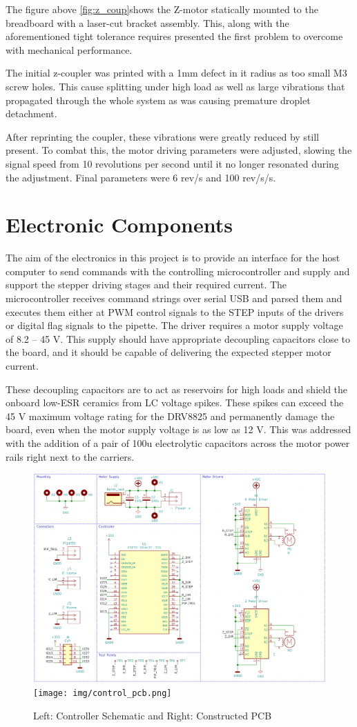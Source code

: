 The figure above \ref{fig:z_coup}shows the Z-motor statically mounted to the breadboard with a laser-cut bracket assembly. This, along with the aforementioned tight tolerance requires presented the first problem to overcome with mechanical performance.

The initial z-coupler was printed with a 1mm defect in it radius as too small M3 screw holes. This cause splitting under high load as well as large vibrations that propagated through the whole system as was causing premature droplet detachment.

After reprinting the coupler, these vibrations were greatly reduced by still present. To combat this, the motor driving parameters were adjusted, slowing the signal speed from 10 revolutions per second until it no longer resonated during the adjustment. Final parameters were 6 rev/s and 100 rev/s/s.

\section{Electronic Components}

The aim of the electronics in this project is to provide an interface for the host computer to send commands with the controlling microcontroller and supply and support the stepper driving stages and their required current. The microcontroller receives command strings over serial USB and parsed them and executes them either at PWM control signals to the STEP inputs of the drivers or digital flag signals to the pipette. The driver requires a motor supply voltage of 8.2 – 45 V. This supply should have appropriate decoupling capacitors close to the board, and it should be capable of delivering the expected stepper motor current.

These decoupling capacitors are to act as reservoirs for high loads and shield the onboard low-ESR ceramics from LC voltage spikes. These spikes can exceed the 45 V maximum voltage rating for the DRV8825 and permanently damage the board, even when the motor supply voltage is as low as 12 V. This was addressed with the addition of  a pair of 100u electrolytic capacitors across the motor power rails right next to the carriers.

\begin{figure}[h]
    \centering
    \includegraphics[height=0.3\textwidth]{img/schem.png}
    \texttt{[image: img/control\_pcb.png]}
    \caption{Left: Controller Schematic and Right: Constructed PCB}
    \label{fig:schem_pcb}
\end{figure}

